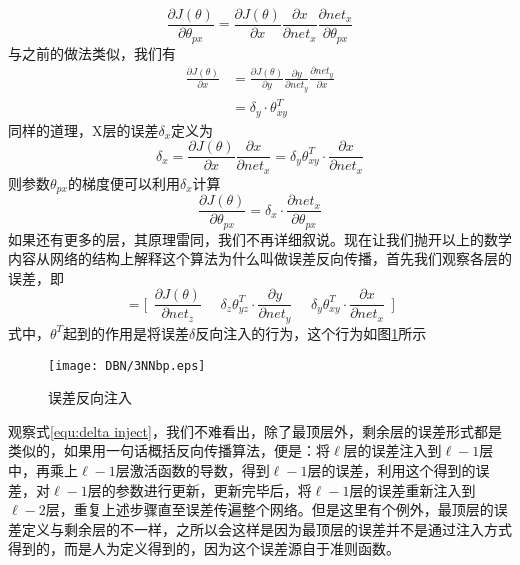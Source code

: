 \begin{equation}
\frac{\partial J(\theta)}{\partial\theta_{px}} = \frac{\partial J(\theta)}{\partial x} \frac{\partial x}{\partial net_x} \frac{\partial net_x}{\partial \theta_{px}}\label{equ:zzz}
\end{equation}
与之前的做法类似，我们有
\begin{equation}
\begin{split}
\frac{\partial J(\theta)}{\partial x} & = \frac{\partial J(\theta)}{\partial y}  \frac{\partial y}{\partial net_y}\frac{\partial net_y}{\partial x}\\
&=\delta_y \cdot \theta_{xy}^T
\end{split}
\end{equation}
同样的道理，X层的误差$\delta_x$定义为
\begin{equation}
\delta_x =   \frac{\partial J(\theta)}{\partial x} \frac{\partial x}{\partial net_x} = \delta_y  \theta_{xy}^T \cdot \frac{\partial x}{\partial net_x}
\end{equation}
则参数$\theta_{px}$的梯度便可以利用$\delta_x$计算
\begin{equation}
\frac{\partial J(\theta)}{\partial\theta_{px}} = \delta_x \cdot \frac{\partial net_x}{\partial \theta_{px}}
\end{equation}
如果还有更多的层，其原理雷同，我们不再详细叙说。现在让我们抛开以上的数学内容从网络的结构上解释这个算法为什么叫做误差反向传播，首先我们观察各层的误差，即
\begin{equation}
[\delta_z~~\delta_y~~\delta_x ] = \bigg[~~
\frac{\partial J(\theta)}{\partial net_z}~~~~~~
\delta_z \theta_{yz}^T  \cdot \frac{\partial y}{\partial net_y}~~~~~~
\delta_y  \theta_{xy}^T \cdot \frac{\partial x}{\partial net_x}
~~\bigg]\label{equ:delta inject}
\end{equation}
式中，$\theta^T$起到的作用是将误差$\delta$反向注入的行为，这个行为如图\ref{img:3NNbp}所示
\begin{figure}[!htbp]
\centering
\texttt{[image: DBN/3NNbp.eps]}
\caption{误差反向注入}
\label{img:3NNbp}
\end{figure}

观察式\eqref{equ:delta inject}，我们不难看出，除了最顶层外，剩余层的误差形式都是类似的，如果用一句话概括反向传播算法，便是：将$\ell$层的误差注入到$\ell - 1$层中，再乘上$\ell -1$层激活函数的导数，得到$\ell - 1$层的误差，利用这个得到的误差，对$\ell - 1$层的参数进行更新，更新完毕后，将$\ell - 1$层的误差重新注入到$\ell - 2$层，重复上述步骤直至误差传遍整个网络。但是这里有个例外，最顶层的误差定义与剩余层的不一样，之所以会这样是因为最顶层的误差并不是通过注入方式得到的，而是人为定义得到的，因为这个误差源自于准则函数。

